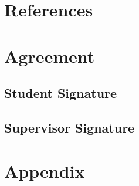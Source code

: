 \documentclass{article}
\begin{document}
    \section{References}
        

    \section{Agreement}
        \subsection{Student Signature}
            \vspace{1in}

        \subsection{Supervisor Signature}
            \vspace{1in}

    \section{Appendix}
        
\end{document}
